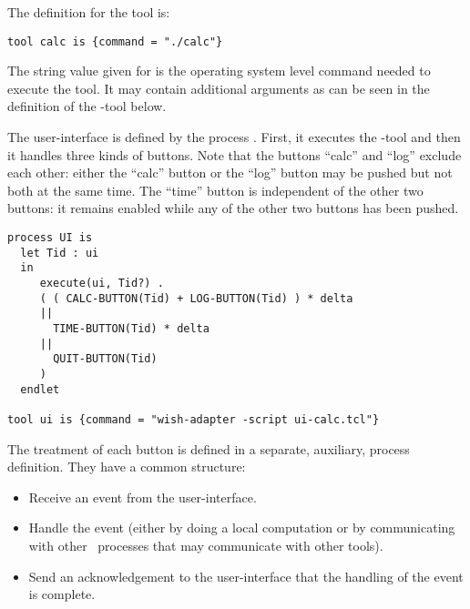  \noindent The definition for the  tool is:

\small
\begin{verbatim}
tool calc is {command = "./calc"}

\end{verbatim}
\noindent
\normalsize
 The string value given for  is the operating system level
 command needed to execute the tool. It may contain additional arguments
 as can be seen in the definition of the -tool below.

 The user-interface is defined by the
 process . First, it executes the -tool and then
 it handles three kinds of buttons.
 Note that the buttons ``calc'' and ``log'' exclude each other:
 either the ``calc'' button or the ``log'' button may be pushed but not both at the same time.
 The ``time'' button is independent of the other two buttons: it remains enabled
 while any of the other two buttons has been pushed.

\small
\begin{verbatim}
process UI is
  let Tid : ui
  in
     execute(ui, Tid?) .
     ( ( CALC-BUTTON(Tid) + LOG-BUTTON(Tid) ) * delta
     ||
       TIME-BUTTON(Tid) * delta
     ||
       QUIT-BUTTON(Tid)
     )
  endlet

tool ui is {command = "wish-adapter -script ui-calc.tcl"}

\end{verbatim}
\noindent
\normalsize
 The treatment of each button is defined in a separate, auxiliary,
 process definition. They have a common structure:
 \begin{itemize}
 \item Receive an event from the user-interface.
 \item Handle the event (either by doing a local
 computation or by communicating with other \TB\ processes that may
 communicate with other tools).
 \item Send an acknowledgement to the user-interface that the handling
 of the event is complete.
 \end{itemize}

